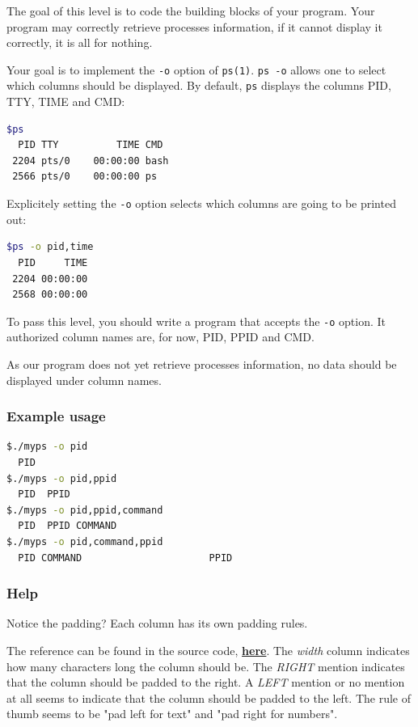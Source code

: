 \documentclass[12pt]{article}
\let\oldhref\href
\renewcommand{\href}[2]{\oldhref{#1}{\bfseries#2}}
\begin{document}
The goal of this level is to code the building blocks of your program. Your program may correctly retrieve processes information, if it cannot display it correctly, it is all for nothing.

Your goal is to implement the \texttt{-o} option of \texttt{ps(1)}. \texttt{ps -o} allows one to select which columns should be displayed. By default, \texttt{ps} displays the columns PID, TTY, TIME and CMD:

\begin{lstlisting}[language=bash]
$ps
  PID TTY          TIME CMD
 2204 pts/0    00:00:00 bash
 2566 pts/0    00:00:00 ps
\end{lstlisting}

Explicitely setting the \texttt{-o} option selects which columns are going to be printed out:

\begin{lstlisting}[language=bash]
$ps -o pid,time
  PID     TIME
 2204 00:00:00
 2568 00:00:00
\end{lstlisting}

To pass this level, you should write a program that accepts the \texttt{-o} option. It authorized column names are, for now, PID, PPID and CMD.

As our program does not yet retrieve processes information, no data should be displayed under column names.

\subsubsection{Example usage}

\begin{lstlisting}[language=bash]
$./myps -o pid
  PID
$./myps -o pid,ppid
  PID  PPID
$./myps -o pid,ppid,command
  PID  PPID COMMAND
$./myps -o pid,command,ppid
  PID COMMAND                      PPID
\end{lstlisting}


\subsubsection{Help}

Notice the padding? Each column has its own padding rules.

The reference can be found in the source code, \href{https://gitlab.com/procps-ng/procps/-/blob/master/ps/output.c\#L1479}{here}. The \textit{width} column indicates how many characters long the column should be. The \textit{RIGHT} mention indicates that the column should be padded to the right. A \textit{LEFT} mention or no mention at all seems to indicate that the column should be padded to the left. The rule of thumb seems to be "pad left for text" and "pad right for numbers".
\end{document}
